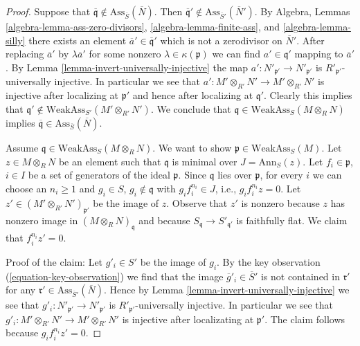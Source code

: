 \documentclass[10pt,a4paper]{amsart}
\theoremstyle{plain}
\theoremstyle{definition}
\theoremstyle{remark}
\numberwithin{equation}{subsection}
\begin{document}
\begin{proof}
\medskip\noindent
Suppose that
$\overline{\mathfrak q} \not \in \text{Ass}_{\overline{S}}(\overline{N})$.
Then
$\overline{\mathfrak q}' \not \in \text{Ass}_{\overline{S}'}(\overline{N}')$.
By
Algebra, Lemmas \ref{algebra-lemma-ass-zero-divisors},
\ref{algebra-lemma-finite-ass}, and
\ref{algebra-lemma-silly}
there exists an element $\overline{a}' \in \overline{\mathfrak q}'$
which is not a zerodivisor on $\overline{N}'$.
After replacing $\overline{a}'$ by $\lambda \overline{a}'$ for some nonzero
$\lambda \in \kappa(\mathfrak p)$ we can find
$a' \in \mathfrak q'$ mapping to $\overline{a}'$. By
Lemma \ref{lemma-invert-universally-injective}
the map $a' : N'_{\mathfrak p'} \to N'_{\mathfrak p'}$ is
$R'_{\mathfrak p'}$-universally injective. In particular
we see that $a' : M' \otimes_{R'} N' \to M' \otimes_{R'} N'$ is
injective after localizing at $\mathfrak p'$ and hence after
localizing at $\mathfrak q'$. Clearly this implies that
$\mathfrak q' \not \in \text{WeakAss}_{S'}(M' \otimes_{R'} N')$.
We conclude that $\mathfrak q \in \text{WeakAss}_S(M \otimes_R N)$ implies
$\overline{\mathfrak q} \in \text{Ass}_{\overline{S}}(\overline{N})$.

\medskip\noindent
Assume $\mathfrak q \in \text{WeakAss}_S(M \otimes_R N)$. We want
to show $\mathfrak p \in \text{WeakAss}_S(M)$.
Let $z \in M \otimes_R N$ be an element such that $\mathfrak q$
is minimal over $J = \text{Ann}_S(z)$.
Let $f_i \in \mathfrak p$, $i \in I$ be a set of generators of the
ideal $\mathfrak p$. Since $\mathfrak q$ lies over $\mathfrak p$, for every $i$
we can choose an $n_i \geq 1$ and $g_i \in S$, $g_i \not \in \mathfrak q$
with $g_i f_i^{n_i} \in J$, i.e., $g_i f_i^{n_i} z = 0$.
Let $z' \in (M' \otimes_{R'} N')_{\mathfrak p'}$ be the image of $z$.
Observe that $z'$ is nonzero because $z$ has nonzero image in
$(M \otimes_R N)_\mathfrak q$ and because $S_\mathfrak q \to S'_{\mathfrak q'}$
is faithfully flat. We claim that $f_i^{n_i} z' = 0$.

\medskip\noindent
Proof of the claim: Let $g'_i \in S'$ be the image of $g_i$.
By the key observation (\ref{equation-key-observation})
we find that the image $\overline{g}'_i \in \overline{S}'$
is not contained in $\mathfrak r'$ for any
$\mathfrak r' \in \text{Ass}_{\overline{S}'}(\overline{N})$.
Hence by Lemma \ref{lemma-invert-universally-injective}
we see that $g'_i : N'_{\mathfrak p'} \to N'_{\mathfrak p'}$ is
$R'_{\mathfrak p'}$-universally injective. In particular
we see that $g'_i : M' \otimes_{R'} N' \to M' \otimes_{R'} N'$ is
injective after localizating at $\mathfrak p'$. The claim
follows because $g_i f_i^{n_i} z' = 0$.


\end{proof}
\end{document}
